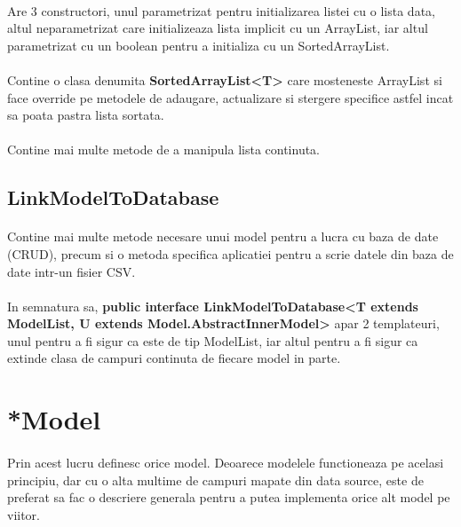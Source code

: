 \documentclass[oneside]{article}
\begin{document}
\paragraph{} Are 3 constructori, unul parametrizat pentru initializarea listei cu o lista data, altul neparametrizat care initializeaza lista implicit cu un ArrayList, iar altul parametrizat cu un boolean pentru a initializa cu un SortedArrayList.
\paragraph{} Contine o clasa denumita \textbf{SortedArrayList<T>} care mosteneste ArrayList si face override pe metodele de adaugare, actualizare si stergere specifice astfel incat sa poata pastra lista sortata.
\paragraph{} Contine mai multe metode de a manipula lista continuta.

\subsection[LinkModelToDatabase]{LinkModelToDatabase}
\paragraph{} Contine mai multe metode necesare unui model pentru a lucra cu baza de date (CRUD), precum si o metoda specifica aplicatiei pentru a scrie datele din baza de date intr-un fisier CSV.

\paragraph{} In semnatura sa, \textbf{public interface LinkModelToDatabase<T extends ModelList, U extends Model.AbstractInnerModel>} apar 2 templateuri, unul pentru a fi sigur ca este de tip ModelList, iar altul pentru a fi sigur ca extinde clasa de campuri continuta de fiecare model in parte.

\section[*Model]{*Model}
\paragraph{} Prin acest lucru definesc orice model. Deoarece modelele functioneaza pe acelasi principiu, dar cu o alta multime de campuri mapate din data source, este de preferat sa fac o descriere generala pentru a putea implementa orice alt model pe viitor.
\end{document}
